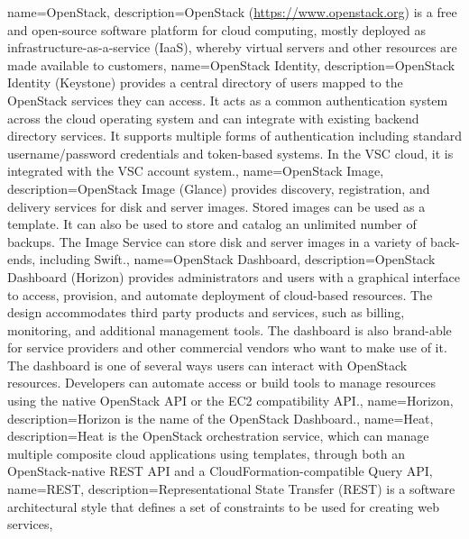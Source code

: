{ name={OpenStack},
  description={OpenStack (\url{https://www.openstack.org}) is a free
    and open-source software platform for cloud computing, mostly
    deployed as infrastructure-as-a-service (IaaS), whereby virtual
    servers and other resources are made available to customers}, }
{ name={OpenStack Identity},
  description={OpenStack Identity (Keystone) provides a central
    directory of users mapped to the OpenStack services they can
    access. It acts as a common authentication system across the cloud
    operating system and can integrate with existing backend directory
    services. It supports multiple forms of authentication including
    standard username/password credentials and token-based systems.
    In the VSC cloud, it is integrated with the VSC account system.},
}
{
  name={OpenStack Image},
  description={OpenStack Image (Glance) provides discovery,
  registration, and delivery services for disk and server images. Stored
  images can be used as a template. It can also be used to store and
  catalog an unlimited number of backups. The Image Service can store
  disk and server images in a variety of back-ends, including Swift.},
}
{
  name={OpenStack Dashboard},
  description={OpenStack Dashboard (Horizon) provides administrators and
  users with a graphical interface to access, provision, and automate
  deployment of cloud-based resources. The design accommodates third
  party products and services, such as billing, monitoring, and
  additional management tools. The dashboard is also brand-able for
  service providers and other commercial vendors who want to make use of
  it. The dashboard is one of several ways users can interact with
  OpenStack resources. Developers can automate access or build tools to
  manage resources using the native OpenStack API or the EC2
  compatibility API.},
}
{
  name={Horizon},
  description={Horizon is the name of the \gls{OpenStack Dashboard}.},
}
{
  name={Heat},
  description={Heat is the OpenStack orchestration service, which can
  manage multiple composite cloud applications using templates,
  through both an OpenStack-native \gls{REST} API and a
  CloudFormation-compatible Query API},
}
{
  name={REST},
  description={Representational State Transfer (REST) is a software
  architectural style that defines a set of constraints to be used for
  creating web services},
}
